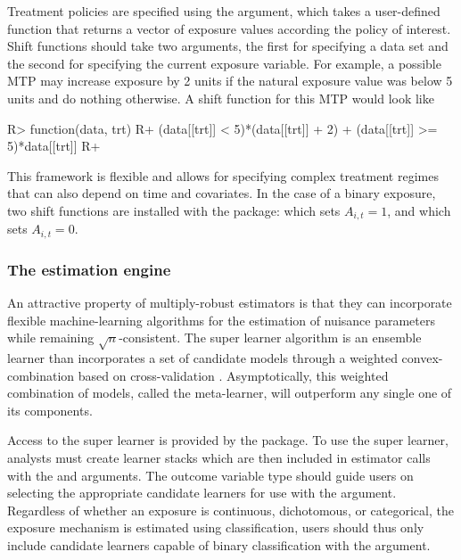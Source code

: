 \documentclass[]{jss}
\begin{document}
Treatment policies are specified using the  argument, which
takes a user-defined function that returns a vector of exposure values
according the policy of interest. Shift functions should take two
arguments, the first for specifying a data set and the second for
specifying the current exposure variable. For example, a possible MTP
may increase exposure by 2 units if the natural exposure value was below
5 units and do nothing otherwise. A shift function for this MTP would
look like

\begin{CodeChunk}

\begin{CodeInput}
R> function(data, trt) {
R+  (data[[trt]] < 5)*(data[[trt]] + 2) + (data[[trt]] >= 5)*data[[trt]]
R+ }
\end{CodeInput}

\end{CodeChunk}

This framework is flexible and allows for specifying complex treatment
regimes that can also depend on time and covariates. In the case of a
binary exposure, two shift functions are installed with
the package:  which sets \(A_{i, t} = 1\), and
 which sets \(A_{i, t} = 0\).

\hypertarget{the-estimation-engine}{%
\subsubsection{The estimation engine}\label{the-estimation-engine}}

An attractive property of multiply-robust estimators is that they can
incorporate flexible machine-learning algorithms for the estimation of
nuisance parameters while remaining \(\sqrt{n}\)-consistent. The super
learner algorithm is an ensemble learner than incorporates a set of
candidate models through a weighted convex-combination based on
cross-validation \citep{laanSuperLearner2007}. Asymptotically, this
weighted combination of models, called the meta-learner, will outperform
any single one of its components.

Access to the super learner is provided by the  package. To use
the super learner, analysts must create  learner stacks which
are then included in estimator calls with the  and
 arguments. The outcome variable type should guide
users on selecting the appropriate candidate learners for use with the
 argument. Regardless of whether an exposure is
continuous, dichotomous, or categorical, the exposure mechanism is
estimated using classification, users should thus only include candidate
learners capable of binary classification with the 
argument.
\end{document}
